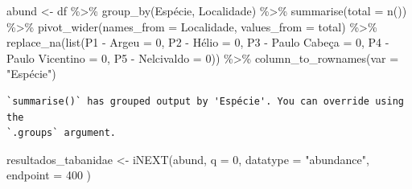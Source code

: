 \documentclass[
  letterpaper,
  DIV=11,
  numbers=noendperiod]{scrartcl}
\newenvironment{Shaded}{\begin{snugshade}}{\end{snugshade}}
\newcommand{\AttributeTok}[1]{\textcolor[rgb]{0.40,0.45,0.13}{#1}}
\newcommand{\DecValTok}[1]{\textcolor[rgb]{0.68,0.00,0.00}{#1}}
\newcommand{\FunctionTok}[1]{\textcolor[rgb]{0.28,0.35,0.67}{#1}}
\newcommand{\NormalTok}[1]{\textcolor[rgb]{0.00,0.23,0.31}{#1}}
\newcommand{\OtherTok}[1]{\textcolor[rgb]{0.00,0.23,0.31}{#1}}
\newcommand{\SpecialCharTok}[1]{\textcolor[rgb]{0.37,0.37,0.37}{#1}}
\newcommand{\StringTok}[1]{\textcolor[rgb]{0.13,0.47,0.30}{#1}}
\begin{document}
\begin{Shaded}
\begin{Highlighting}[]
\NormalTok{abund }\OtherTok{\textless{}{-}}\NormalTok{ df }\SpecialCharTok{\%\textgreater{}\%}
  \FunctionTok{group\_by}\NormalTok{(Espécie, Localidade) }\SpecialCharTok{\%\textgreater{}\%}
  \FunctionTok{summarise}\NormalTok{(}\AttributeTok{total =} \FunctionTok{n}\NormalTok{()) }\SpecialCharTok{\%\textgreater{}\%}
  \FunctionTok{pivot\_wider}\NormalTok{(}\AttributeTok{names\_from =}\NormalTok{ Localidade, }\AttributeTok{values\_from =}\NormalTok{ total)  }\SpecialCharTok{\%\textgreater{}\%}
  \FunctionTok{replace\_na}\NormalTok{(}\FunctionTok{list}\NormalTok{(}\StringTok{\textasciigrave{}}\AttributeTok{P1 {-} Argeu}\StringTok{\textasciigrave{}} \OtherTok{=} \DecValTok{0}\NormalTok{, }\StringTok{\textasciigrave{}}\AttributeTok{P2 {-} Hélio}\StringTok{\textasciigrave{}} \OtherTok{=} \DecValTok{0}\NormalTok{, }\StringTok{\textasciigrave{}}\AttributeTok{P3 {-} Paulo Cabeça}\StringTok{\textasciigrave{}} \OtherTok{=} \DecValTok{0}\NormalTok{,}
                  \StringTok{\textasciigrave{}}\AttributeTok{P4 {-} Paulo Vicentino}\StringTok{\textasciigrave{}} \OtherTok{=} \DecValTok{0}\NormalTok{, }\StringTok{\textasciigrave{}}\AttributeTok{P5 {-} Nelcivaldo}\StringTok{\textasciigrave{}} \OtherTok{=} \DecValTok{0}\NormalTok{)) }\SpecialCharTok{\%\textgreater{}\%}
  \FunctionTok{column\_to\_rownames}\NormalTok{(}\AttributeTok{var =} \StringTok{"Espécie"}\NormalTok{)}
\end{Highlighting}
\end{Shaded}

\begin{verbatim}
`summarise()` has grouped output by 'Espécie'. You can override using the
`.groups` argument.
\end{verbatim}

\begin{Shaded}
\begin{Highlighting}[]
\NormalTok{resultados\_tabanidae }\OtherTok{\textless{}{-}} \FunctionTok{iNEXT}\NormalTok{(abund,}
                              \AttributeTok{q =} \DecValTok{0}\NormalTok{,}
                              \AttributeTok{datatype =} \StringTok{"abundance"}\NormalTok{,}
                              \AttributeTok{endpoint =} \DecValTok{400}
\NormalTok{)}
\end{Highlighting}
\end{Shaded}

\begin{Shaded}
\end{Shaded}
\end{document}
